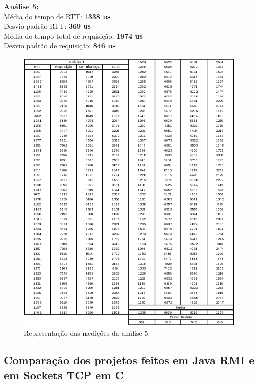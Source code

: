 \documentclass[11pt,twoside]{article}
\begin{document}
\textbf{Análise 5: }\\
Média do tempo de RTT: \textbf{1338 us}\\
Desvio padrão RTT: \textbf{369 us}\\
Média do tempo total de requisição: \textbf{1974 us}\\
Desvio padrão de requisição: \textbf{846 us}\\
\begin{figure}[htb]
  \centering
  \includegraphics[width=15cm]{analise5.png} 
  \caption{Representação das medições da análise 5.}
  \label{fig:analise5}
\end{figure}

\subsection{Comparação dos projetos feitos em Java RMI e em Sockets TCP em C }
\end{document}
